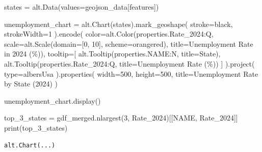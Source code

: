 \documentclass[
  letterpaper,
  DIV=11,
  numbers=noendperiod]{scrartcl}
\newenvironment{Shaded}{\begin{snugshade}}{\end{snugshade}}
\newcommand{\BuiltInTok}[1]{\textcolor[rgb]{0.00,0.23,0.31}{#1}}
\newcommand{\DecValTok}[1]{\textcolor[rgb]{0.68,0.00,0.00}{#1}}
\newcommand{\NormalTok}[1]{\textcolor[rgb]{0.00,0.23,0.31}{#1}}
\newcommand{\OperatorTok}[1]{\textcolor[rgb]{0.37,0.37,0.37}{#1}}
\newcommand{\StringTok}[1]{\textcolor[rgb]{0.13,0.47,0.30}{#1}}
\begin{document}
\begin{Shaded}
\begin{Highlighting}[]
\NormalTok{states }\OperatorTok{=}\NormalTok{ alt.Data(values}\OperatorTok{=}\NormalTok{geojson\_data[}\StringTok{\textquotesingle{}features\textquotesingle{}}\NormalTok{])}

\NormalTok{unemployment\_chart }\OperatorTok{=}\NormalTok{ alt.Chart(states).mark\_geoshape(}
\NormalTok{    stroke}\OperatorTok{=}\StringTok{\textquotesingle{}black\textquotesingle{}}\NormalTok{,}
\NormalTok{    strokeWidth}\OperatorTok{=}\DecValTok{1}
\NormalTok{).encode(}
\NormalTok{    color}\OperatorTok{=}\NormalTok{alt.Color(}\StringTok{\textquotesingle{}properties.Rate\_2024:Q\textquotesingle{}}\NormalTok{,}
\NormalTok{                    scale}\OperatorTok{=}\NormalTok{alt.Scale(domain}\OperatorTok{=}\NormalTok{[}\DecValTok{0}\NormalTok{, }\DecValTok{10}\NormalTok{], scheme}\OperatorTok{=}\StringTok{\textquotesingle{}orangered\textquotesingle{}}\NormalTok{),}
\NormalTok{                    title}\OperatorTok{=}\StringTok{\textquotesingle{}Unemployment Rate in 2024 (\%)\textquotesingle{}}\NormalTok{),}
\NormalTok{    tooltip}\OperatorTok{=}\NormalTok{[}
\NormalTok{        alt.Tooltip(}\StringTok{\textquotesingle{}properties.NAME:N\textquotesingle{}}\NormalTok{, title}\OperatorTok{=}\StringTok{\textquotesingle{}State\textquotesingle{}}\NormalTok{),}
\NormalTok{        alt.Tooltip(}\StringTok{\textquotesingle{}properties.Rate\_2024:Q\textquotesingle{}}\NormalTok{, title}\OperatorTok{=}\StringTok{\textquotesingle{}Unemployment Rate (\%)\textquotesingle{}}\NormalTok{)}
\NormalTok{    ]}
\NormalTok{).project(}
    \BuiltInTok{type}\OperatorTok{=}\StringTok{\textquotesingle{}albersUsa\textquotesingle{}}
\NormalTok{).properties(}
\NormalTok{    width}\OperatorTok{=}\DecValTok{500}\NormalTok{,}
\NormalTok{    height}\OperatorTok{=}\DecValTok{500}\NormalTok{,}
\NormalTok{    title}\OperatorTok{=}\StringTok{\textquotesingle{}Unemployment Rate by State (2024)\textquotesingle{}}
\NormalTok{)}

\NormalTok{unemployment\_chart.display()}

\NormalTok{top\_3\_states }\OperatorTok{=}\NormalTok{ gdf\_merged.nlargest(}\DecValTok{3}\NormalTok{, }\StringTok{\textquotesingle{}Rate\_2024\textquotesingle{}}\NormalTok{)[[}\StringTok{\textquotesingle{}NAME\textquotesingle{}}\NormalTok{, }\StringTok{\textquotesingle{}Rate\_2024\textquotesingle{}}\NormalTok{]]}
\BuiltInTok{print}\NormalTok{(top\_3\_states)}
\end{Highlighting}
\end{Shaded}

\begin{verbatim}
alt.Chart(...)
\end{verbatim}
\end{document}
